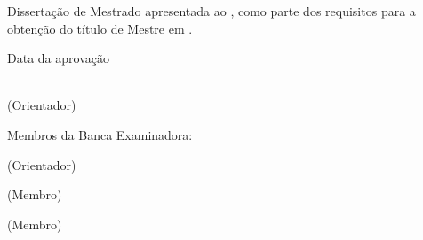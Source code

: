 \begingroup

\begin{center}
\authorname

\vspace{1.5cm}

\doctitlebrazilian
\end{center}

\vspace{2cm}

\begin{flushright}
\begin{minipage}{.5\textwidth}
Dissertação de Mestrado apresentada ao \universityfull, como parte dos requisitos para a obtenção do título de 
Mestre em \knowledgearea.

\vspace{2cm}

Data da aprovação \signaturedate

\vspace{2cm}

\hrulefill\\
\supervisor\space(Orientador)\\
\universityfull
\end{minipage}
\end{flushright}

\vspace{1.0 cm}

\begin{flushleft}
Membros da Banca Examinadora:

\supervisor\space(Orientador)\\
\supervisorinstitution{}

\membernameone\space(Membro)\\
\memberinstitutionone

\membernametwo\space(Membro)\\
\memberinstitutiontwo
\end{flushleft}

\endgroup
